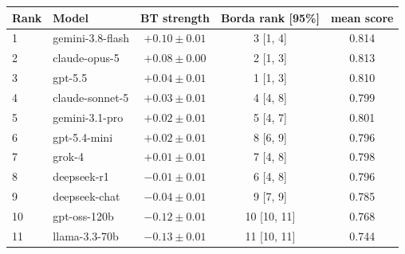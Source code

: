 \begin{tabular}{llccc}
\toprule
Rank & Model & BT strength & Borda rank [95\%] & mean score \\
\midrule
1 & gemini-3.8-flash & $+0.10 \pm 0.01$ & 3 [1, 4] & 0.814 \\
2 & claude-opus-5 & $+0.08 \pm 0.00$ & 2 [1, 3] & 0.813 \\
3 & gpt-5.5 & $+0.04 \pm 0.01$ & 1 [1, 3] & 0.810 \\
4 & claude-sonnet-5 & $+0.03 \pm 0.01$ & 4 [4, 8] & 0.799 \\
5 & gemini-3.1-pro & $+0.02 \pm 0.01$ & 5 [4, 7] & 0.801 \\
6 & gpt-5.4-mini & $+0.02 \pm 0.01$ & 8 [6, 9] & 0.796 \\
7 & grok-4 & $+0.01 \pm 0.01$ & 7 [4, 8] & 0.798 \\
8 & deepseek-r1 & $-0.01 \pm 0.01$ & 6 [4, 8] & 0.796 \\
9 & deepseek-chat & $-0.04 \pm 0.01$ & 9 [7, 9] & 0.785 \\
10 & gpt-oss-120b & $-0.12 \pm 0.01$ & 10 [10, 11] & 0.768 \\
11 & llama-3.3-70b & $-0.13 \pm 0.01$ & 11 [10, 11] & 0.744 \\
\bottomrule
\end{tabular}
